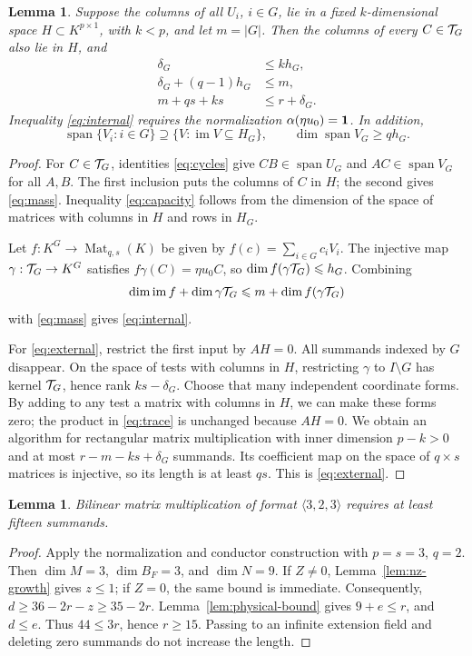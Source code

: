 \documentclass[11pt,a4paper]{article}
\numberwithin{equation}{section}
\theoremstyle{plain}
\newtheorem{lemma}[theorem]{Lemma}
\theoremstyle{definition}
\DeclareMathOperator{\im}{im}\DeclareMathOperator{\supp}{supp}
\DeclareMathOperator{\Mat}{Mat}\DeclareMathOperator{\Span}{span}
\newcommand{\leqs}{\leqslant}\newcommand{\geqs}{\geqslant}
\begin{document}
\begin{lemma}\label{lem:budgets}
Suppose the columns of all $U_i$, $i\in G$, lie in a fixed
$k$-dimensional space $H\subset K^{p\times1}$, with $k<p$, and let
$m=|G|$. Then the columns of every $C\in\mathcal T_G$ also lie in $H$, and
\begin{align}
 \delta_G&\leqs k h_G,\label{eq:capacity}\\
 \delta_G+(q-1)h_G&\leqs m,\label{eq:internal}\\
 m+qs+ks&\leqs r+\delta_G.\label{eq:external}
\end{align}
Inequality \eqref{eq:internal} requires the normalization
$\alpha(\eta u_0)=\mathbf1$. In addition,
\begin{equation}\label{eq:mass}
 \Span\{V_i:i\in G\}\supseteq\{V: \im V\subseteq H_G\},
 \qquad \dim\Span V_G\geqs qh_G.
\end{equation}
\end{lemma}
\begin{proof}
For $C\in\mathcal T_G$, identities \eqref{eq:cycles} give
$CB\in\Span U_G$ and $AC\in\Span V_G$ for all $A,B$.
The first inclusion puts the columns of $C$ in $H$; the second gives
\eqref{eq:mass}. Inequality \eqref{eq:capacity} follows from the
dimension of the space of matrices with columns in $H$ and rows in $H_G$.

Let $f:K^G\to\Mat_{q,s}(K)$ be given by $f(c)=\sum_{i\in G}c_iV_i$.
The injective map $\gamma:\mathcal T_G\to K^G$ satisfies
$f\gamma(C)=\eta u_0C$, so $\dim f(\gamma\test_G)\leqs h_G$.
Combining
\[
 \dim\im f+\dim\gamma\test_G\leqs m+\dim f(\gamma\test_G)
\]
with \eqref{eq:mass} gives \eqref{eq:internal}.

For \eqref{eq:external}, restrict the first input by $AH=0$.
All summands indexed by $G$ disappear. On the space of tests with
columns in $H$, restricting $\gamma$ to $I\setminus G$ has kernel
$\mathcal T_G$, hence rank $ks-\delta_G$. Choose that many independent
coordinate forms. By adding to any test a matrix with columns in $H$,
we can make these forms zero; the product in \eqref{eq:trace} is
unchanged because $AH=0$. We obtain an algorithm for rectangular
matrix multiplication with inner dimension $p-k>0$ and at most
$r-m-ks+\delta_G$ summands. Its coefficient map on the space of
$q\times s$ matrices is injective, so its length is at least $qs$.
This is \eqref{eq:external}.
\end{proof}

\begin{lemma}\label{lem:rect15}
Bilinear matrix multiplication of format $\langle3,2,3\rangle$ requires
at least fifteen summands.
\end{lemma}
\begin{proof}
Apply the normalization and conductor construction with $p=s=3$,
$q=2$. Then $\dim M=3$, $\dim B_F=3$, and $\dim N=9$.
If $Z\ne0$, Lemma~\ref{lem:nz-growth} gives $z\leqs1$; if $Z=0$,
the same bound is immediate. Consequently,
$d\geqs36-2r-z\geqs35-2r$.
Lemma~\ref{lem:physical-bound} gives $9+e\leqs r$, and $d\leqs e$.
Thus $44\leqs3r$, hence $r\geqs15$.
Passing to an infinite extension field and deleting zero summands do
not increase the length.
\end{proof}
\end{document}
